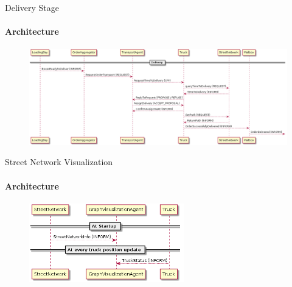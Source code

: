 \documentclass[9pt]{beamer}
\begin{document}
\begin{frame}{Delivery Stage}
\framesubtitle{Architecture}
\begin{figure}[h!]
	\centering
	\includegraphics[width=\textwidth]{../Architecture/Architecture_Delivery.png}
\end{figure}
\end{frame}

\begin{frame}{Street Network Visualization}
\framesubtitle{Architecture}
\begin{figure}[h!]
	\centering
	\includegraphics[width=0.6\textwidth]{../Architecture/Architecture_Visualization.png}
\end{figure}
\end{frame}
\end{document}
